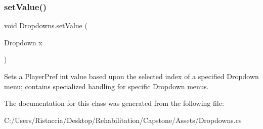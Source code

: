 \subsubsection{\texorpdfstring{set\+Value()}{setValue()}}
{\footnotesize\ttfamily void Dropdowns.\+set\+Value (\begin{DoxyParamCaption}\item[{Dropdown}]{x }\end{DoxyParamCaption})}

Sets a Player\+Pref int value based upon the selected index of a specified Dropdown menu; contains specialized handling for specific Dropdown menus. 

The documentation for this class was generated from the following file\+:\begin{DoxyCompactItemize}
\item 
C\+:/\+Users/\+Ristaccia/\+Desktop/\+Rehabilitation/\+Capstone/\+Assets/Dropdowns.\+cs\end{DoxyCompactItemize}
